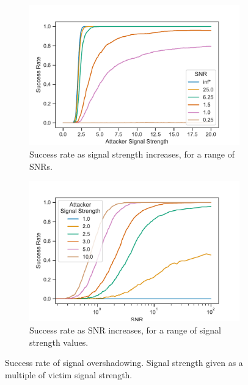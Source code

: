 \begin{figure}
    \centering
    \begin{subfigure}{0.95\columnwidth}
        \centering
        \includegraphics[width=\columnwidth]{diagrams/attack_strength.pdf}
        \caption{Success rate as signal strength increases, for a range of SNRs.\\\footnotesize{}}
        \label{fig:attack_strength}
    \end{subfigure}
    \hfill
    \begin{subfigure}{0.95\columnwidth}
        \centering
        \includegraphics[width=\columnwidth]{diagrams/attack_snr.pdf}
        \caption{Success rate as SNR increases, for a range of signal strength values.}
        \label{fig:attack_snr}
    \end{subfigure}
    \caption{Success rate of signal overshadowing. Signal strength given as a multiple of victim signal strength.}
\end{figure}


